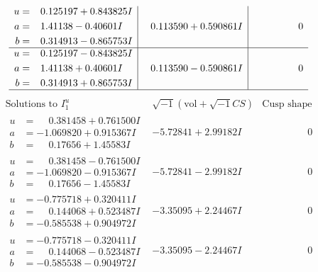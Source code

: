 \documentclass[1p]{elsarticle_modified}
\theoremstyle{definition}
\newcommand{\I}{\sqrt{-1}}
\begin{document}
$$\begin{array}{c|c|c}
\begin{aligned}
u &= \phantom{-}0.125197 + 0.843825 I \\
a &= \phantom{-}1.41138 - 0.40601 I \\
b &= \phantom{-}0.314913 - 0.865753 I\end{aligned}
 & \phantom{-}0.113590 + 0.590861 I & \phantom{-0.000000 } 0 \\ \hline\begin{aligned}
u &= \phantom{-}0.125197 - 0.843825 I \\
a &= \phantom{-}1.41138 + 0.40601 I \\
b &= \phantom{-}0.314913 + 0.865753 I\end{aligned}
 & \phantom{-}0.113590 - 0.590861 I & \phantom{-0.000000 } 0\\
 \hline 
 \end{array}$$\newpage$$\begin{array}{c|c|c}  
\text{Solutions to }I^u_{1}& \I (\text{vol} + \sqrt{-1}CS) & \text{Cusp shape}\\
 \hline 
\begin{aligned}
u &= \phantom{-}0.381458 + 0.761500 I \\
a &= -1.069820 + 0.915367 I \\
b &= \phantom{-}0.17656 + 1.45583 I\end{aligned}
 & -5.72841 + 2.99182 I & \phantom{-0.000000 } 0 \\ \hline\begin{aligned}
u &= \phantom{-}0.381458 - 0.761500 I \\
a &= -1.069820 - 0.915367 I \\
b &= \phantom{-}0.17656 - 1.45583 I\end{aligned}
 & -5.72841 - 2.99182 I & \phantom{-0.000000 } 0 \\ \hline\begin{aligned}
u &= -0.775718 + 0.320411 I \\
a &= \phantom{-}0.144068 + 0.523487 I \\
b &= -0.585538 + 0.904972 I\end{aligned}
 & -3.35095 + 2.24467 I & \phantom{-0.000000 } 0 \\ \hline\begin{aligned}
u &= -0.775718 - 0.320411 I \\
a &= \phantom{-}0.144068 - 0.523487 I \\
b &= -0.585538 - 0.904972 I\end{aligned}
 & -3.35095 - 2.24467 I & \phantom{-0.000000 } 0 \\ \hline\begin{aligned}

\end{aligned}
\end{array}$$
\end{document}
